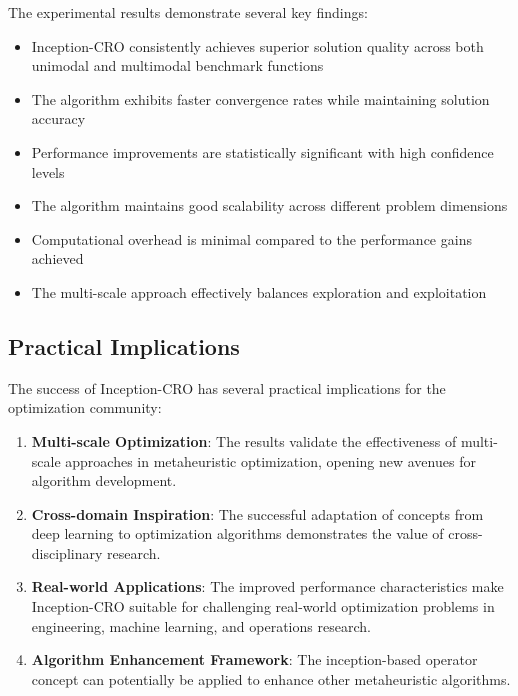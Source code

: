 The experimental results demonstrate several key findings:

\begin{itemize}
    \item Inception-CRO consistently achieves superior solution quality across both unimodal and multimodal benchmark functions
    \item The algorithm exhibits faster convergence rates while maintaining solution accuracy
    \item Performance improvements are statistically significant with high confidence levels
    \item The algorithm maintains good scalability across different problem dimensions
    \item Computational overhead is minimal compared to the performance gains achieved
    \item The multi-scale approach effectively balances exploration and exploitation
\end{itemize}

\subsection{Practical Implications}

The success of Inception-CRO has several practical implications for the optimization community:

\begin{enumerate}
    \item \textbf{Multi-scale Optimization}: The results validate the effectiveness of multi-scale approaches in metaheuristic optimization, opening new avenues for algorithm development.
    
    \item \textbf{Cross-domain Inspiration}: The successful adaptation of concepts from deep learning to optimization algorithms demonstrates the value of cross-disciplinary research.
    
    \item \textbf{Real-world Applications}: The improved performance characteristics make Inception-CRO suitable for challenging real-world optimization problems in engineering, machine learning, and operations research.
    
    \item \textbf{Algorithm Enhancement Framework}: The inception-based operator concept can potentially be applied to enhance other metaheuristic algorithms.
\end{enumerate}

